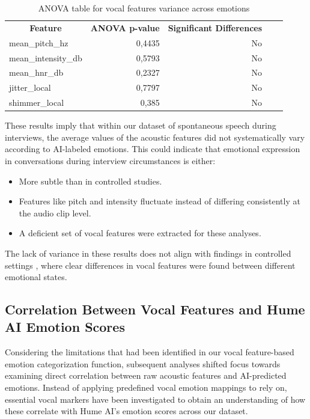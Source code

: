 \begin{table}[H]
    \centering
    \begin{tabular}{l|r|rrr}
    \multicolumn{1}{c|}{\textbf{Feature}} & \multicolumn{1}{c|}{\textbf{ANOVA p-value}} & \multicolumn{1}{c}{\textbf{Significant Differences}} &  &  \\ \cline{1-3}
   
    mean\_pitch\_hz                      & 0,4435                                     & No                                                   &  &  \\
    mean\_intensity\_db                  & 0,5793                                     & No                                                   &  &  \\
    mean\_hnr\_db                        & 0,2327                                     & No                                                   &  &  \\
    jitter\_local                        & 0,7797                                     & No                                                   &  &  \\
    shimmer\_local                       & 0,385                                      & No                                                   &  & 
    \end{tabular}
    \caption{ANOVA table for vocal features variance across emotions}
    \label{tab:anova-rq1}
\end{table}
These results imply that within our dataset of spontaneous speech during interviews, the average values of the acoustic features did not systematically vary according to AI-labeled emotions. This could indicate that emotional expression in conversations during interview circumstances is either: 
\begin{itemize}
    \item More subtle than in controlled studies.
    \item Features like pitch and intensity fluctuate instead of differing consistently at the audio clip level. 
    \item A deficient set of vocal features were extracted for these analyses. 
\end{itemize}
The lack of variance in these results does not align with findings in controlled settings \autocite{Ekberg2023}, where clear differences in vocal features were found between different emotional states. 

\subsection{Correlation Between Vocal Features and Hume AI Emotion Scores}
Considering the limitations that had been identified in our vocal feature-based emotion categorization function, subsequent analyses shifted focus towards examining direct correlation between raw acoustic features and AI-predicted emotions. Instead of applying predefined vocal emotion mappings to rely on, essential vocal markers have been investigated to obtain an understanding of how these correlate with Hume AI’s emotion scores across our dataset. 

